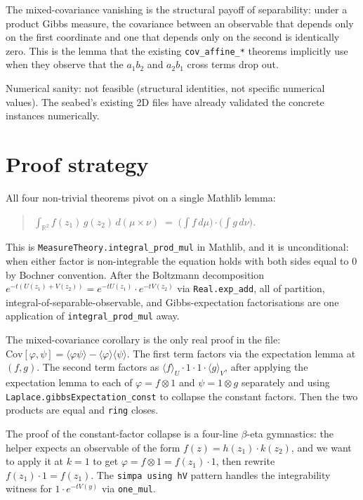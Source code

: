 \documentclass[11pt]{article}
\begin{document}
The mixed-covariance vanishing is the structural payoff of separability:
under a product Gibbs measure, the covariance between an observable
that depends only on the first coordinate and one that depends only on
the second is identically zero. This is the lemma that the existing
\texttt{cov\_affine\_*} theorems implicitly use when they observe that
the $a_1 b_2$ and $a_2 b_1$ cross terms drop out.

Numerical sanity: not feasible (structural identities, not specific
numerical values). The seabed's existing 2D files have already
validated the concrete instances numerically.

\section{Proof strategy}

All four non-trivial theorems pivot on a single Mathlib lemma:

\begin{quote}\itshape
$\int_{\mathbb{R}^2} f(z_1)\, g(z_2)\, d(\mu \times \nu)
\;=\; \big(\int f\, d\mu\big) \cdot \big(\int g\, d\nu\big)$.
\end{quote}

This is \texttt{MeasureTheory.integral\_prod\_mul} in Mathlib, and it
is unconditional: when either factor is non-integrable the equation
holds with both sides equal to $0$ by Bochner convention. After the
Boltzmann decomposition $e^{-t(U(z_1) + V(z_2))} = e^{-t U(z_1)} \cdot
e^{-t V(z_2)}$ via \texttt{Real.exp\_add}, all of partition,
integral-of-separable-observable, and Gibbs-expectation factorisations
are one application of \texttt{integral\_prod\_mul} away.

The mixed-covariance corollary is the only real proof in the file:
$\mathrm{Cov}[\varphi, \psi] = \langle \varphi \psi \rangle - \langle
\varphi \rangle \langle \psi \rangle$. The first term factors via the
expectation lemma at $(f, g)$. The second term factors as $\langle f
\rangle_U \cdot 1 \cdot 1 \cdot \langle g \rangle_V$, after applying the
expectation lemma to each of $\varphi = f \otimes 1$ and $\psi = 1
\otimes g$ separately and using
\texttt{Laplace.gibbsExpectation\_const} to collapse the constant
factors. Then the two products are equal and \texttt{ring} closes.

The proof of the constant-factor collapse is a four-line $\beta$-eta
gymnastics: the helper expects an observable of the form $f(z) = h(z_1) \cdot
k(z_2)$, and we want to apply it at $k = 1$ to get $\varphi = f \otimes 1
= f(z_1) \cdot 1$, then rewrite $f(z_1) \cdot 1 = f(z_1)$. The
\texttt{simpa using hV} pattern handles the integrability witness for
$1 \cdot e^{-t V(y)}$ via \texttt{one\_mul}.
\end{document}

